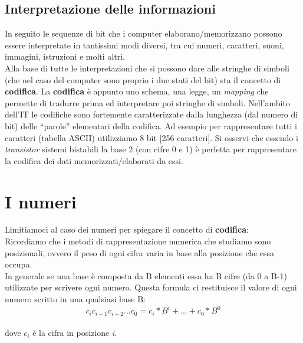 \subsection{Interpretazione delle informazioni} In seguito le sequenze di bit che i computer elaborano/memorizzano possono essere interpretate in tantissimi modi diversi, tra cui numeri, caratteri, suoni, immagini, istruzioni e molti altri.\\
Alla base di tutte le interpretazioni che si possono dare alle stringhe di simboli (che nel caso del computer sono proprio i due stati del bit) sta il concetto di \textbf{codifica}. La \textbf{codifica} è appunto uno schema, una legge, un \textit{mapping} che permette di tradurre prima ed interpretare poi stringhe di simboli.
Nell’ambito dell’IT le codifiche sono fortemente caratterizzate dalla lunghezza (dal numero di bit) delle “parole” elementari della codifica. Ad esempio per rappresentare tutti i caratteri (tabella ASCII) utilizziamo  8 bit [256 caratteri].
Si osservi che essendo i \textit{transistor} sistemi bistabili la base 2 (con cifre 0 e 1) è perfetta per rappresentare la codifica dei dati memorizzati/elaborati da essi.
\section{I numeri}
Limitiamoci al caso dei numeri per spiegare il concetto di \textbf{codifica}:\\
Ricordiamo che i  metodi di rappresentazione numerica che studiamo sono posizionali, ovvero il peso di ogni cifra varia in base alla posizione che essa  occupa.\\
In generale se una base è composta da B elementi essa ha B cifre (da 0 a B-1) utilizzate per scrivere ogni numero.
Questa formula ci restituisce il valore di ogni numero scritto in una qualsiasi base B:\\
\[c_{i} c_{i-1} c_{i-2}... c_{0}=c_{i}*B^{i}+...+c_{0}*B^{0}\]\\
dove $c_{i}$ è la cifra in posizione \textit{i}.

